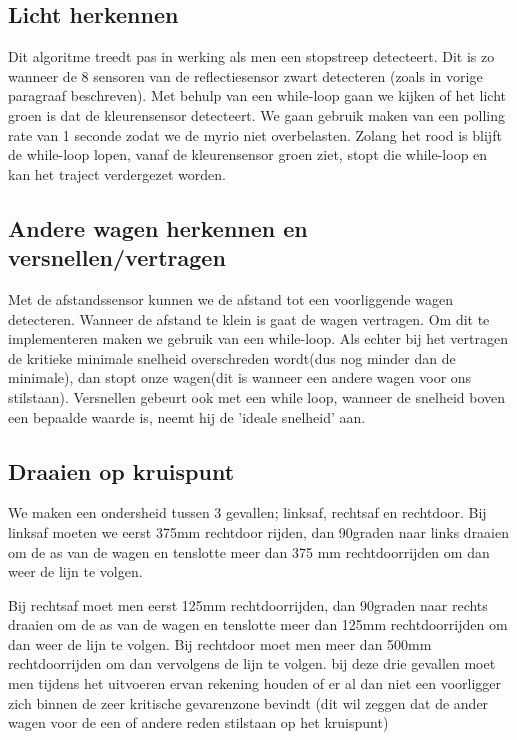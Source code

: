 \documentclass[12pt]{article}
\begin{document}
\subsection{Licht herkennen}
Dit algoritme treedt pas in werking als men een stopstreep detecteert. Dit is zo wanneer de 8 sensoren van de reflectiesensor zwart detecteren (zoals in vorige paragraaf beschreven). Met behulp van een while-loop gaan we kijken of het licht groen is dat de kleurensensor detecteert. We gaan gebruik maken van een polling rate van 1 seconde zodat we de myrio niet overbelasten. Zolang het rood is blijft de while-loop lopen, vanaf de kleurensensor groen ziet, stopt die while-loop en kan het traject verdergezet worden.

\subsection{Andere wagen herkennen en versnellen/vertragen}

Met de afstandssensor kunnen we de afstand tot een voorliggende wagen detecteren. Wanneer de afstand te klein is gaat de wagen vertragen. Om dit te implementeren  maken we gebruik van een while-loop. Als echter bij het vertragen de kritieke minimale snelheid overschreden wordt(dus nog minder dan de minimale), dan stopt onze wagen(dit is wanneer een andere wagen voor ons stilstaan). Versnellen gebeurt ook met een while loop, wanneer de snelheid boven een bepaalde waarde is, neemt hij de 'ideale snelheid' aan.

\subsection{Draaien op kruispunt}
We maken een ondersheid tussen 3 gevallen; linksaf, rechtsaf en rechtdoor.
Bij linksaf moeten we eerst 375mm rechtdoor rijden, dan 90graden naar links draaien om de as van de wagen en tenslotte meer dan 375 mm rechtdoorrijden om dan weer de lijn te volgen.

Bij rechtsaf moet men eerst 125mm rechtdoorrijden, dan 90graden naar rechts draaien om de as van de wagen en tenslotte meer dan 125mm rechtdoorrijden om dan weer de lijn te volgen. Bij rechtdoor moet men meer dan 500mm rechtdoorrijden om dan vervolgens de lijn te volgen. bij deze drie gevallen moet men tijdens het uitvoeren ervan rekening houden of er al dan niet een voorligger zich binnen de zeer kritische gevarenzone bevindt (dit wil zeggen dat de ander wagen voor de een of andere reden stilstaan op het kruispunt)
\end{document}
